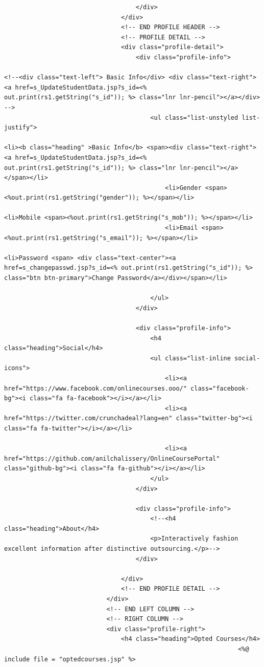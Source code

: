 \begin{verbatim}
									</div>
								</div> 
								<!-- END PROFILE HEADER -->
								<!-- PROFILE DETAIL -->
								<div class="profile-detail">
									<div class="profile-info">
                                                                            <!--<div class="text-left"> Basic Info</div> <div class="text-right"><a href=s_UpdateStudentData.jsp?s_id=<% out.print(rs1.getString("s_id")); %> class="lnr lnr-pencil"></a></div> -->
										<ul class="list-unstyled list-justify">
                                                                                    <li><b class="heading" >Basic Info</b> <span><div class="text-right"><a href=s_UpdateStudentData.jsp?s_id=<% out.print(rs1.getString("s_id")); %> class="lnr lnr-pencil"></a></span></li>
											<li>Gender <span><%out.print(rs1.getString("gender")); %></span></li>
                                                                                    <li>Mobile <span><%out.print(rs1.getString("s_mob")); %></span></li>
											<li>Email <span><%out.print(rs1.getString("s_email")); %></span></li>
                                                                                        <li>Password <span> <div class="text-center"><a href=s_changepasswd.jsp?s_id=<% out.print(rs1.getString("s_id")); %> class="btn btn-primary">Change Password</a></div></span></li>
											
										</ul>
									</div>
                                                                                       
									<div class="profile-info">
										<h4 class="heading">Social</h4>
										<ul class="list-inline social-icons">
											<li><a href="https://www.facebook.com/onlinecourses.ooo/" class="facebook-bg"><i class="fa fa-facebook"></i></a></li>
											<li><a href="https://twitter.com/crunchadeal?lang=en" class="twitter-bg"><i class="fa fa-twitter"></i></a></li>
											
											<li><a href="https://github.com/anilchalissery/OnlineCoursePortal" class="github-bg"><i class="fa fa-github"></i></a></li>
										</ul>
									</div>
                                                                        
									<div class="profile-info">
										<!--<h4 class="heading">About</h4>
										<p>Interactively fashion excellent information after distinctive outsourcing.</p>-->
									</div>
									
								</div>
								<!-- END PROFILE DETAIL -->
							</div>
							<!-- END LEFT COLUMN -->
							<!-- RIGHT COLUMN -->
							<div class="profile-right">
								<h4 class="heading">Opted Courses</h4>
                                                                <%@ include file = "optedcourses.jsp" %>
                                                                

\end{verbatim}
